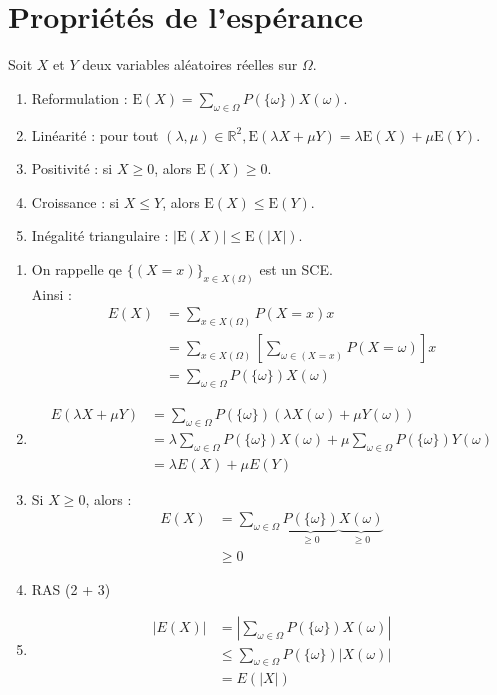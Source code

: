 \documentclass[../main.tex]{subfiles}
\begin{document}
\section{Propriétés de l'espérance}
\begin{tcolorbox}[title=Propostion 33.5, title filled=false, colframe=lightblue, colback=lightblue!10!white]
    Soit $X$ et $Y$ deux variables aléatoires réelles sur $\Omega$.
    \begin{enumerate}
        \item Reformulation : $\mathrm{E}(X)=\sum_{\omega \in \Omega} P(\{\omega\}) X(\omega)$.
        \item Linéarité : pour tout $(\lambda, \mu) \in \mathbb{R}^2, \mathrm{E}(\lambda X+\mu Y)=\lambda \mathrm{E}(X)+\mu \mathrm{E}(Y)$.
        \item Positivité : si $X \geq 0$, alors $\mathrm{E}(X) \geq 0$.
        \item Croissance : si $X \leq Y$, alors $\mathrm{E}(X) \leq \mathrm{E}(Y)$.
        \item Inégalité triangulaire : $|\mathrm{E}(X)| \leq \mathrm{E}(|X|)$.
    \end{enumerate}
\end{tcolorbox}

\begin{enumerate}
    \item On rappelle qe $\{(X=x)\}_{x\in X(\Omega)}$ est un SCE. \\
    Ainsi : 
    \begin{align*}
        E(X) &= \sum_{x\in X(\Omega)} P(X=x) x \\
        &= \sum_{x\in X(\Omega)} \left[ \sum_{\omega\in (X=x)} P(X = \omega) \right] x \\
        &= \sum_{\omega\in \Omega} P(\{\omega\}) X(\omega)
    \end{align*}
    \item \begin{align*}
        E(\lambda X+\mu Y) &= \sum_{\omega\in \Omega} P(\{\omega\}) (\lambda X(\omega)+\mu Y(\omega)) \\
        &= \lambda \sum_{\omega\in \Omega} P(\{\omega\}) X(\omega) + \mu \sum_{\omega\in \Omega} P(\{\omega\}) Y(\omega) \\
        &= \lambda E(X) + \mu E(Y)
    \end{align*}
    \item Si $X\geq 0$, alors : 
    \begin{align*}
        E(X) &= \sum_{\omega\in \Omega} \underbrace{P(\{\omega\})}_{\geq 0} \underbrace{X(\omega)}_{\geq 0} \\
        &\geq 0
    \end{align*}
    \item RAS (2 + 3)
    \item \begin{align*}
        |E(X)| &= \left| \sum_{\omega\in \Omega} P(\{\omega\}) X(\omega) \right| \\
        &\leq \sum_{\omega\in \Omega} P(\{\omega\}) |X(\omega)| \\
        &= E(|X|)
    \end{align*}
\end{enumerate}
\end{document}
